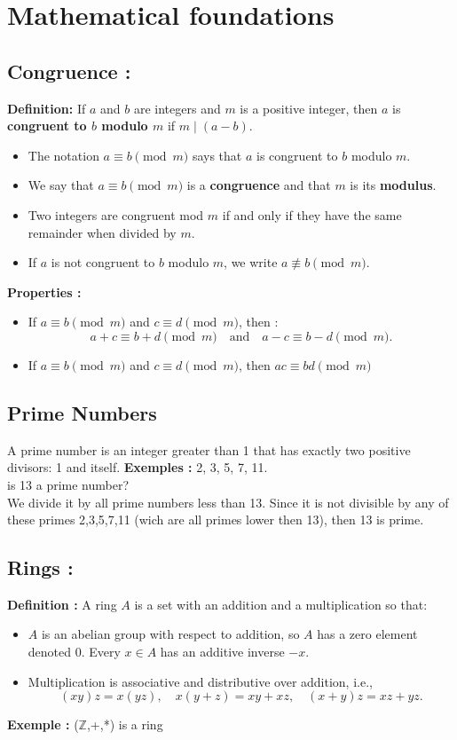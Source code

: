 \chapter{Mathematical foundations}
\section{Congruence :}
\textbf{Definition:} If $a$ and $b$ are integers and $m$ is a positive integer, then $a$ is \textbf{congruent to $b$ modulo $m$} if $m \mid (a - b)$.

\begin{itemize}
    \item The notation $a \equiv b \pmod{m}$ says that $a$ is congruent to $b$ modulo $m$.
    \item We say that $a \equiv b \pmod{m}$ is a \textbf{congruence} and that $m$ is its \textbf{modulus}.
    \item Two integers are congruent mod $m$ if and only if they have the same remainder when divided by $m$.
    \item If $a$ is not congruent to $b$ modulo $m$, we write $a \not\equiv b \pmod{m}$.
\end{itemize}
\textbf{Properties :}
\begin{itemize}
\item If $a \equiv b \pmod{m}$ and $c \equiv d \pmod{m}$, then :
\[
a + c \equiv b + d \pmod{m}
\quad \text{and} \quad
a - c \equiv b - d \pmod{m}.
\]
\item If $a  \equiv b \pmod{m}$ and $c  \equiv d \pmod{m}$, then $ac  \equiv bd \pmod{m}$
\end{itemize}


\section{Prime Numbers} 
\label{subsec:prime}

A prime number is an integer greater than 1 that has exactly two positive divisors: 1 and itself.
\textbf{Exemples :} 2, 3, 5, 7, 11.\\
 
 is 13 a prime number?
\\We divide it by all prime numbers less than 13. Since it is not divisible by any of these primes {2,3,5,7,11} (wich are all primes lower then 13), then 13 is prime.


\section{Rings :}
\textbf{Definition :}
 A ring $A$ is a set with an addition and a multiplication so that:
\begin{itemize}
\item $A$ is an abelian group with respect to addition, so $A$ has a zero element denoted $0$. Every $x \in A$ has an additive inverse $-x$.

\item Multiplication is associative and distributive over addition, i.e.,
\[
(xy)z = x(yz), \quad
x(y + z) = xy + xz, \quad
(x + y)z = xz + yz.
\]
\end{itemize}
\textbf{Exemple : }
($\mathbb{Z}$,+,*) is a ring



